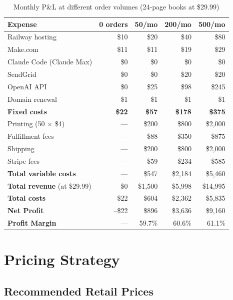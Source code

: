 \documentclass[12pt, letterpaper, oneside]{book}
\begin{document}
\begin{table}[H]
\centering
\small
\begin{tabularx}{\textwidth}{Xrrrr}
\toprule
\textbf{Expense} & \textbf{0 orders} & \textbf{50/mo} & \textbf{200/mo} & \textbf{500/mo} \\
\midrule
Railway hosting & \$10 & \$20 & \$40 & \$80 \\
Make.com & \$11 & \$11 & \$19 & \$29 \\
Claude Code (Claude Max) & \$0 & \$0 & \$0 & \$0 \\
SendGrid & \$0 & \$0 & \$20 & \$20 \\
OpenAI API & \$0 & \$25 & \$98 & \$245 \\
Domain renewal & \$1 & \$1 & \$1 & \$1 \\
\midrule
\textbf{Fixed costs} & \textbf{\$22} & \textbf{\$57} & \textbf{\$178} & \textbf{\$375} \\
\midrule
Printing (50 $\times$ \$4) & --- & \$200 & \$800 & \$2{,}000 \\
Fulfillment fees & --- & \$88 & \$350 & \$875 \\
Shipping & --- & \$200 & \$800 & \$2{,}000 \\
Stripe fees & --- & \$59 & \$234 & \$585 \\
\midrule
\textbf{Total variable costs} & --- & \$547 & \$2{,}184 & \$5{,}460 \\
\midrule
\textbf{Total revenue} (at \$29.99) & \$0 & \$1{,}500 & \$5{,}998 & \$14{,}995 \\
\textbf{Total costs} & \$22 & \$604 & \$2{,}362 & \$5{,}835 \\
\textbf{Net Profit} & \textcolor{danger}{--\$22} & \textcolor{success}{\$896} & \textcolor{success}{\$3{,}636} & \textcolor{success}{\$9{,}160} \\
\textbf{Profit Margin} & --- & 59.7\% & 60.6\% & 61.1\% \\
\bottomrule
\end{tabularx}
\caption{Monthly P\&L at different order volumes (24-page books at \$29.99)}
\end{table}


\chapter{Pricing Strategy}

\section{Recommended Retail Prices}
\end{document}
